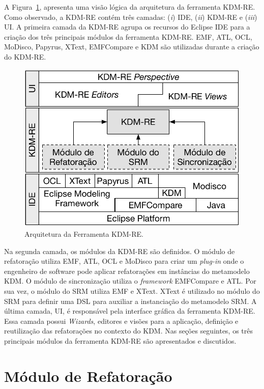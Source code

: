 A Figura~\ref{fig:arquitetura_ferramenta_kdm_re}, apresenta uma visão lógica da arquitetura da ferramenta KDM-RE. Como observado, a KDM-RE contém três camadas: (\textit{i}) IDE, (\textit{ii}) KDM-RE e (\textit{iii}) UI. A primeira camada da KDM-RE agrupa os recursos do Eclipse IDE para a criação dos três principais módulos da ferramenta KDM-RE. EMF, ATL, OCL, MoDisco, Papyrus, XText, EMFCompare e KDM são utilizadas durante a criação do KDM-RE.

\begin{figure}[h]
	\centering
	\caption{Arquitetura da Ferramenta KDM-RE.}
	\label{fig:arquitetura_ferramenta_kdm_re}
	\includegraphics[scale=0.75]{images/arquitetura_KDM-RE}
	\fautor
\end{figure}

Na segunda camada, os módulos da KDM-RE são definidos. O módulo de refatoração utiliza EMF, ATL, OCL e MoDisco para criar um \textit{plug-in} onde o engenheiro de software pode aplicar refatorações em instâncias do metamodelo KDM. O módulo de sincronização utiliza o \textit{framework} EMFCompare e ATL. Por sua vez, o módulo do SRM utiliza EMF e XText. XText é utilizado no módulo do SRM para definir uma DSL para auxiliar a instanciação do metamodelo SRM. A última camada, UI, é responsável pela interface gráfica da ferramenta KDM-RE. Essa camada possui \textit{Wizards}, editores e visões para a aplicação, definição e reutilização das refatorações no contexto do KDM. Nas seções seguintes, os três principais módulos da ferramenta KDM-RE são apresentados e discutidos.


\section{Módulo de Refatoração}\label{sec:modulo_de_refatoracao_kdm_re}

